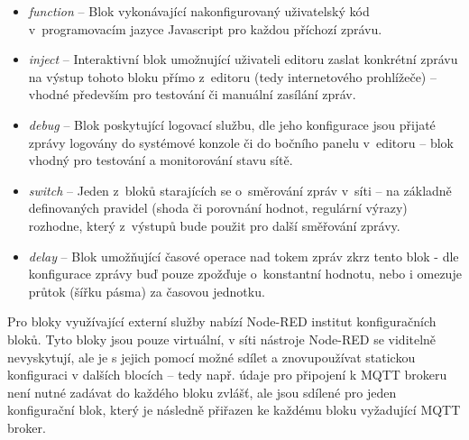 \begin{itemize}
    \item\emph{function} -- Blok vykonávající nakonfigurovaný uživatelský kód v~programovacím jazyce Javascript pro
    každou příchozí zprávu.
    \item\emph{inject} -- Interaktivní blok umožnující uživateli editoru zaslat konkrétní zprávu na výstup tohoto bloku
    přímo z~editoru (tedy internetového prohlížeče) -- vhodné především pro testování či manuální zasílání zpráv.
    \item\emph{debug} -- Blok poskytující logovací službu, dle jeho konfigurace jsou přijaté zprávy logovány do systémové konzole či do
    bočního panelu v~editoru -- blok vhodný pro testování a monitorování stavu sítě.
    \item\emph{switch} -- Jeden z~bloků starajících se o~směrování zpráv v~síti -- na základně definovaných pravidel
    (shoda či porovnání hodnot, regulární výrazy) rozhodne, který z~výstupů bude použit pro další směřování zprávy.
    \item\emph{delay} -- Blok umožňující časové operace nad tokem zpráv zkrz tento blok - dle konfigurace zprávy buď
    pouze zpožďuje o~konstantní hodnotu, nebo i omezuje průtok (šířku pásma) za časovou jednotku.
\end{itemize}

Pro bloky využívající externí služby nabízí Node-RED institut konfiguračních bloků.
Tyto bloky jsou pouze virtuální, v síti nástroje Node-RED se viditelně nevyskytují, ale je
s jejich pomocí možné sdílet a znovupoužívat statickou konfiguraci v dalších blocích -- tedy např. údaje pro
připojení k MQTT brokeru není nutné zadávat do každého bloku zvlášť, ale jsou sdílené pro jeden konfigurační blok,
který je následně přiřazen ke každému bloku vyžadující MQTT broker.

